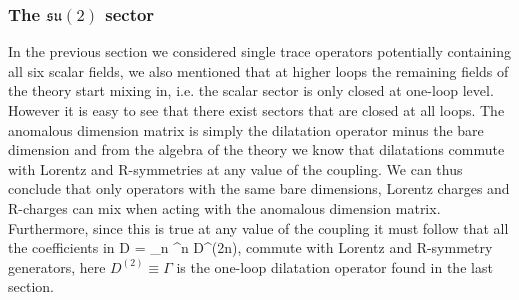 \subsubsection{The $\mathfrak{su}(2)$ sector}

In the previous section we considered single trace operators potentially containing all six scalar fields, we also mentioned that at higher loops the remaining fields of the theory start mixing in, i.e. the scalar sector is only closed at one-loop level.
However it is easy to see that there exist sectors that are closed at all loops.
The anomalous dimension matrix is simply the dilatation operator minus the bare dimension and from the algebra of the theory we know that dilatations commute with Lorentz and R-symmetries at any value of the coupling.
We can thus conclude that only operators with the same bare dimensions, Lorentz charges and R-charges can mix when acting with the anomalous dimension matrix.
Furthermore, since this is true at any value of the coupling it must follow that all the coefficients in
\beq
	D = \sum_n \lambda^n D^{(2n)},
\eeq
commute with  Lorentz and R-symmetry generators, here $D^{(2)} \equiv \Gamma$ is the one-loop dilatation operator found in the last section. 

